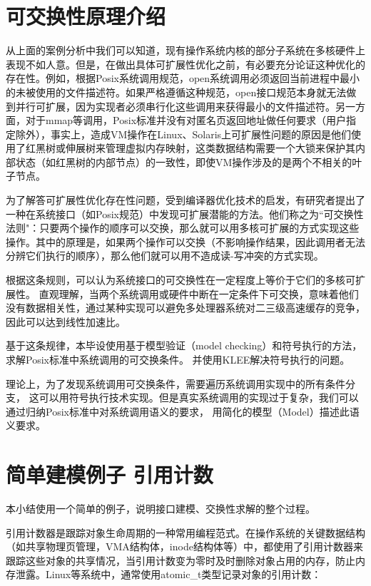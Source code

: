\section{可交换性原理介绍}

从上面的案例分析中我们可以知道，现有操作系统内核的部分子系统在多核硬件上表现不如人意。但是，在做出具体可扩展性优化之前，有必要充分论证这种优化的存在性。例如，根据Posix系统调用规范，open系统调用必须返回当前进程中最小的未被使用的文件描述符。如果严格遵循这种规范，open接口规范本身就无法做到并行可扩展，因为实现者必须串行化这些调用来获得最小的文件描述符。另一方面，对于mmap等调用，Posix标准并没有对匿名页返回地址做任何要求（用户指定除外），事实上，造成VM操作在Linux、Solaris上可扩展性问题的原因是他们使用了红黑树或伸展树来管理虚拟内存映射\cite{radixvm:eurosys13}，这类数据结构需要一个大锁来保护其内部状态（如红黑树的内部节点）的一致性，即使VM操作涉及的是两个不相关的叶子节点。

为了解答可扩展性优化存在性问题，受到编译器优化技术的启发，有研究者提出了一种在系统接口（如Posix规范）中发现可扩展潜能的方法\cite{commuter:2013}。他们称之为``可交换性法则"：只要两个操作的顺序可以交换，那么就可以用多核可扩展的方式实现这些操作。其中的原理是，如果两个操作可以交换（不影响操作结果，因此调用者无法分辨它们执行的顺序），那么他们就可以用不造成读-写冲突的方式实现。

根据这条规则，可以认为系统接口的可交换性在一定程度上等价于它们的多核可扩展性。
直观理解，当两个系统调用或硬件中断在一定条件下可交换，意味着他们没有数据相关性，通过某种实现可以避免多处理器系统对二三级高速缓存的竞争，
因此可以达到线性加速比。

基于这条规律，本毕设使用基于模型验证（model
checking）和符号执行的方法，求解Posix标准中系统调用的可交换条件。
并使用KLEE\cite{Cadar:2008:KUA:1855741.1855756}解决符号执行的问题。

理论上，为了发现系统调用可交换条件，需要遍历系统调用实现中的所有条件分支，
这可以用符号执行技术实现。但是真实系统调用的实现过于复杂，我们可以通过归纳Posix标准中对系统调用语义的要求，
用简化的模型（Model）描述此语义要求。


\section{简单建模例子 \pozhehao 引用计数}
\label{sec:counter}
本小结使用一个简单的例子，说明接口建模、交换性求解的整个过程。

引用计数器是跟踪对象生命周期的一种常用编程范式。在操作系统的关键数据结构（如共享物理页管理，VMA结构体，inode结构体等）中，都使用了引用计数器来跟踪这些对象的共享情况，当引用计数变为零时及时删除对象占用的内存，防止内存泄露。Linux等系统中，通常使用atomic\_t类型记录对象的引用计数：


